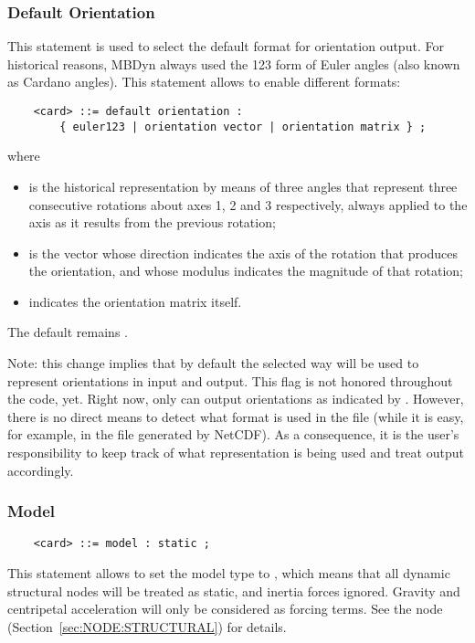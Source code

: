 \subsubsection{Default Orientation}\label{sec:CONTROLDATA:DEFAULTORIENTATION}
This statement is used to select the default format for orientation output.
For historical reasons, MBDyn always used the 123 form of Euler angles
(also known as Cardano angles).
This statement allows to enable different formats:
\begin{verbatim}
    <card> ::= default orientation :
        { euler123 | orientation vector | orientation matrix } ;
\end{verbatim}
where
\begin{itemize}
\item {} is the historical representation by means 
	of three angles that represent three consecutive rotations
	about axes 1, 2 and 3 respectively, always applied to the axis
	as it results from the previous rotation;
\item {} is the vector whose direction indicates
	the axis of the rotation that produces the orientation,
	and whose modulus indicates the magnitude of that rotation;
\item {} indicates the orientation matrix itself.
\end{itemize}
The default remains .

Note: this change implies that by default the selected way will be used
to represent orientations in input and output.
This flag is not honored throughout the code, yet.
Right now, only  can output orientations
as indicated by .
However, there is no direct means to detect what format is used
in the  file (while it is easy, for example, in the 
file generated by NetCDF).
As a consequence, it is the user's responsibility to keep track
of what representation is being used and treat output accordingly.



\subsubsection{Model}
\begin{verbatim}
    <card> ::= model : static ;
\end{verbatim}
This statement allows to set the model type to , which means
that all dynamic structural nodes will be treated as static, and inertia
forces ignored.
Gravity and centripetal acceleration will only be considered as forcing
terms.
See the  node (Section~\ref{sec:NODE:STRUCTURAL}) for details.



